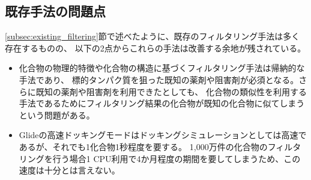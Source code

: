 \subsection{既存手法の問題点}
\ref{subsec:existing_filtering}節で述べたように、既存のフィルタリング手法は多く存在するものの、
以下の2点からこれらの手法は改善する余地が残されている。
\begin{itemize}
\item 化合物の物理的特徴や化合物の構造に基づくフィルタリング手法は帰納的な手法であり、
	標的タンパク質を狙った既知の薬剤や阻害剤が必須となる。さらに既知の薬剤や阻害剤を利用できたとしても、
	化合物の類似性を利用する手法であるためにフィルタリング結果の化合物が既知の化合物に似てしまうという問題がある。	
\item Glideの高速ドッキングモードはドッキングシミュレーションとしては高速であるが、それでも1化合物1秒程度を要する。
	1,000万件の化合物のフィルタリングを行う場合1 CPU利用で4か月程度の期間を要してしまうため、この速度は十分とは言えない。
\end{itemize}
